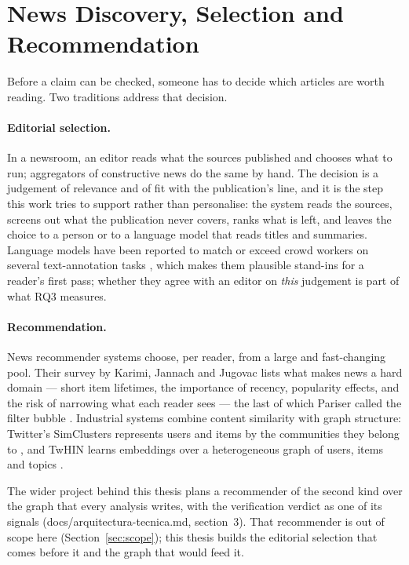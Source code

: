 
\section{News Discovery, Selection and Recommendation}
\label{sec:sota-selection}

Before a claim can be checked, someone has to decide which articles are
worth reading. Two traditions address that decision.

\paragraph{Editorial selection.} In a newsroom, an editor reads what
the sources published and chooses what to run; aggregators of
constructive news do the same by hand. The decision is a judgement of
relevance and of fit with the publication's line, and it is the step
this work tries to support rather than personalise: the system reads
the sources, screens out what the publication never covers, ranks what
is left, and leaves the choice to a person or to a language model that
reads titles and summaries. Language models have been reported to match
or exceed crowd workers on several text-annotation tasks
\cite{gilardi2023chatgpt}, which makes them plausible stand-ins for a
reader's first pass; whether they agree with an editor on \emph{this}
judgement is part of what RQ3 measures.

\paragraph{Recommendation.} News recommender systems choose, per
reader, from a large and fast-changing pool. Their survey by Karimi,
Jannach and Jugovac lists what makes news a hard domain --- short item
lifetimes, the importance of recency, popularity effects, and the
risk of narrowing what each reader sees \cite{karimi2018news} --- the
last of which Pariser called the filter bubble
\cite{pariser2011filter}. Industrial systems combine content
similarity with graph structure: Twitter's SimClusters represents users
and items by the communities they belong to
\cite{satuluri2020simclusters}, and TwHIN learns embeddings over a
heterogeneous graph of users, items and topics
\cite{elkishky2022twhin}.

The wider project behind this thesis plans a recommender of the second
kind over the graph that every analysis writes, with the verification
verdict as one of its signals (docs/arquitectura-tecnica.md,
section~3). That recommender is out of scope here
(Section~\ref{sec:scope}); this thesis builds the editorial selection
that comes before it and the graph that would feed it.

